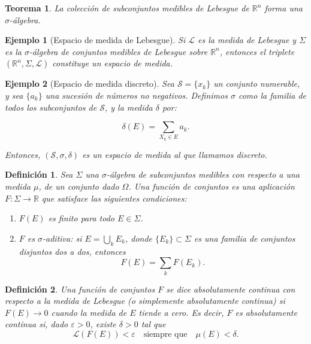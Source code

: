 \documentclass{report}
\newtheorem{thm}{Teorema}[section]
\newtheorem{dfn}{Definición}[section]
\newtheorem{ej}{Ejemplo}[section]
\begin{document}
\begin{thm}
La colección de subconjuntos medibles de Lebesgue de \( \mathbb{R}^n \) forma una \( \sigma \)-álgebra.
\end{thm}


\begin{ej}[Espacio de medida de Lebesgue]
Si \( \mathscr{L}\) es la medida de Lebesgue y \( \Sigma \) es la \(\sigma\)-álgebra de conjuntos medibles de Lebesgue sobre \( \mathbb{R}^n \), 
entonces el triplete \( (\mathbb{R}^n, \Sigma, \mathscr{L}) \) constituye un \textit{espacio de medida}.
\end{ej}

\begin{ej}[Espacio de medida discreto]
Sea \( \mathcal{S} = \{x_k\} \) un conjunto numerable, y sea \( \{a_k\} \) una sucesión de números no negativos. 
Definimos \( \sigma \) como la familia de todos los subconjuntos de \( \mathcal{S} \), y la medida \( \delta \) por:

\[
\delta(E) = \sum_{X_k \in E} a_k.
\]

Entonces, \( (\mathcal{S}, \sigma, \delta) \) es un espacio de medida al que llamamos \emph{discreto}.
\end{ej}

\begin{dfn}
Sea \( \Sigma \) una \( \sigma \)-álgebra de subconjuntos medibles con respecto a una medida $\mu$, de un conjunto dado \( \Omega \). 
Una \emph{función de conjuntos} es una aplicación \( F: \Sigma \to \mathbb{R} \) que satisface las siguientes condiciones:
\begin{enumerate}
    \item \( F(E) \) es finito para todo \( E \in \Sigma \).
    \item \( F \) es \(\sigma\)-aditiva: si \( E = \bigcup_k E_k \), donde \( \{E_k\} \subset \Sigma \) es una familia de conjuntos disjuntos dos a dos, entonces
    \[
        F(E) = \sum_k F(E_k).
    \]
\end{enumerate}
\end{dfn}

\begin{dfn}
Una función de conjuntos \( F \) se dice \emph{absolutamente continua con respecto a la medida de Lebesgue} (o simplemente \emph{absolutamente continua})
 si \( F(E) \to 0 \) cuando la medida de \( E \) tiende a cero. Es decir, \( F \) es absolutamente continua si, dado \( \varepsilon > 0 \), existe \( \delta > 0 \) tal que
\[
\mathcal{L}(F(E)) < \varepsilon \quad \text{siempre que} \quad \mu(E) < \delta.
\]
\end{dfn}
\end{document}
